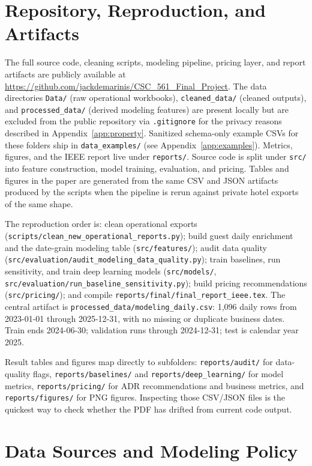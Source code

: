 \documentclass[conference]{IEEEtran}
\begin{document}
\section{Repository, Reproduction, and Artifacts}
\label{app:repo}
The full source code, cleaning scripts, modeling pipeline, pricing layer, and report artifacts are publicly available at \url{https://github.com/jackdemarinis/CSC_561_Final_Project}. The data directories \texttt{Data/} (raw operational workbooks), \texttt{cleaned\_data/} (cleaned outputs), and \texttt{processed\_data/} (derived modeling features) are present locally but are excluded from the public repository via \texttt{.gitignore} for the privacy reasons described in Appendix~\ref{app:property}. Sanitized schema-only example CSVs for these folders ship in \texttt{data\_examples/} (see Appendix~\ref{app:examples}). Metrics, figures, and the IEEE report live under \texttt{reports/}. Source code is split under \texttt{src/} into feature construction, model training, evaluation, and pricing. Tables and figures in the paper are generated from the same CSV and JSON artifacts produced by the scripts when the pipeline is rerun against private hotel exports of the same shape.

The reproduction order is: clean operational exports (\texttt{scripts/clean\_new\_operational\_reports.py}); build guest daily enrichment and the date-grain modeling table (\texttt{src/features/}); audit data quality (\texttt{src/evaluation/audit\_modeling\_data\_quality.py}); train baselines, run sensitivity, and train deep learning models (\texttt{src/models/}, \texttt{src/evaluation/run\_baseline\_sensitivity.py}); build pricing recommendations (\texttt{src/pricing/}); and compile \texttt{reports/final/final\_report\_ieee.tex}. The central artifact is \texttt{processed\_data/modeling\_daily.csv}: 1,096 daily rows from 2023-01-01 through 2025-12-31, with no missing or duplicate business dates. Train ends 2024-06-30; validation runs through 2024-12-31; test is calendar year 2025.

Result tables and figures map directly to subfolders: \texttt{reports/audit/} for data-quality flags, \texttt{reports/baselines/} and \texttt{reports/deep\_learning/} for model metrics, \texttt{reports/pricing/} for ADR recommendations and business metrics, and \texttt{reports/figures/} for PNG figures. Inspecting those CSV/JSON files is the quickest way to check whether the PDF has drifted from current code output.

\section{Data Sources and Modeling Policy}
\end{document}
